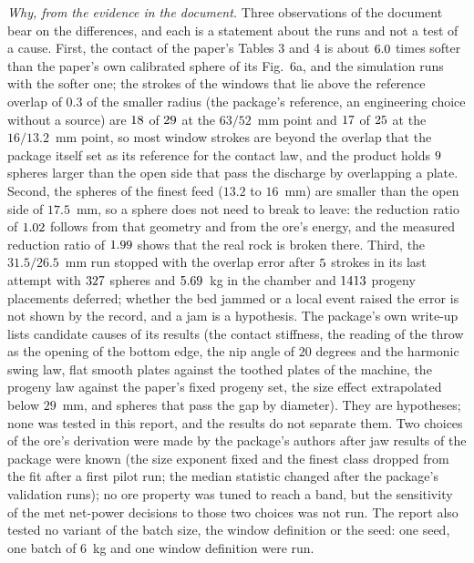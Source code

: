 \emph{Why, from the evidence in the document.} Three observations of the document bear on the differences, and each is a statement about the runs and not a test of a cause. First, the contact of the paper's Tables 3 and 4 is about $6.0$ times softer than the paper's own calibrated sphere of its Fig.~6a, and the simulation runs with the softer one; the strokes of the windows that lie above the reference overlap of $0.3$ of the smaller radius (the package's reference, an engineering choice without a source) are $18$ of $29$ at the $63/52$~mm point and $17$ of $25$ at the $16/13.2$~mm point, so most window strokes are beyond the overlap that the package itself set as its reference for the contact law, and the product holds $9$ spheres larger than the open side that pass the discharge by overlapping a plate. Second, the spheres of the finest feed ($13.2$ to $16$~mm) are smaller than the open side of $17.5$~mm, so a sphere does not need to break to leave: the reduction ratio of $1.02$ follows from that geometry and from the ore's energy, and the measured reduction ratio of $1.99$ shows that the real rock is broken there. Third, the $31.5/26.5$~mm run stopped with the overlap error after $5$ strokes in its last attempt with $327$ spheres and $5.69$~kg in the chamber and $1413$ progeny placements deferred; whether the bed jammed or a local event raised the error is not shown by the record, and a jam is a hypothesis. The package's own write-up lists candidate causes of its results (the contact stiffness, the reading of the throw as the opening of the bottom edge, the nip angle of $20$ degrees and the harmonic swing law, flat smooth plates against the toothed plates of the machine, the progeny law against the paper's fixed progeny set, the size effect extrapolated below $29$~mm, and spheres that pass the gap by diameter). They are hypotheses; none was tested in this report, and the results do not separate them. Two choices of the ore's derivation were made by the package's authors after jaw results of the package were known (the size exponent fixed and the finest class dropped from the fit after a first pilot run; the median statistic changed after the package's validation runs); no ore property was tuned to reach a band, but the sensitivity of the met net-power decisions to those two choices was not run. The report also tested no variant of the batch size, the window definition or the seed: one seed, one batch of $6$~kg and one window definition were run.


